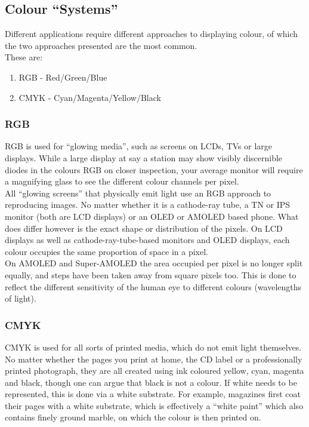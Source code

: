 \subsection{Colour ``Systems''}

Different applications require different approaches to displaying colour, of which the two approaches presented are the most common.
\\
These are:
\begin{enumerate}
	\item RGB -  Red/Green/Blue
	\item CMYK - Cyan/Magenta/Yellow/Black
\end{enumerate}

\subsubsection{RGB}

RGB is used for ``glowing media'', such as screens on LCDs, TVs or large displays. While a large display at say a station may show visibly discernible diodes in the colours RGB on closer inspection, your average monitor will require a magnifying glass to see the different colour channels per pixel.
\\
All ``glowing screens'' that physically emit light use an RGB approach to reproducing images. No matter whether it is a cathode-ray tube, a TN or IPS monitor (both are LCD displays) or an OLED or AMOLED based phone. What does differ however is the exact shape or distribution of the pixels. On LCD displays as well as cathode-ray-tube-based monitors and OLED displays, each colour occupies the same proportion of space in a pixel.
\\
On AMOLED and Super-AMOLED the area occupied per pixel is no longer split equally, and steps have been taken away from square pixels too. This is done to reflect the different sensitivity of the human eye to different colours (wavelengths of light).

\subsubsection{CMYK}

CMYK is used for all sorts of printed media, which do not emit light themselves. No matter whether the pages you print at home, the CD label or a professionally printed photograph, they are all created using ink coloured yellow, cyan, magenta and black, though one can argue that black is not a colour. If white needs to be represented, this is done via a white substrate. For example, magazines first coat their pages with a white substrate, which is effectively a ``white paint'' which also contains finely ground marble, on which the colour is then printed on.

